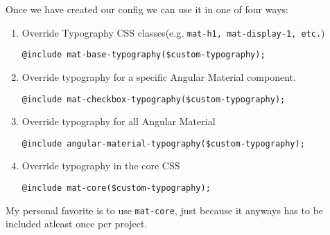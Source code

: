 
Once we have created our config we can use it in one of four ways: 
\begin{enumerate}
\item Override Typography CSS classes(e.g. \lstinline{mat-h1, mat-display-1, etc.})
\begin{verbatim}
@include mat-base-typography($custom-typography);
\end{verbatim}

\item Override typography for a specific Angular Material component.
\begin{verbatim}
@include mat-checkbox-typography($custom-typography);
\end{verbatim}

\item Override typography for all Angular Material
\begin{verbatim}
@include angular-material-typography($custom-typography);
\end{verbatim}

\item Override typography in the core CSS
\begin{verbatim}
@include mat-core($custom-typography);
\end{verbatim}
\end{enumerate}

My personal favorite is to use \lstinline{mat-core}, just because it anyways  
has to be included atleast once per project. 



